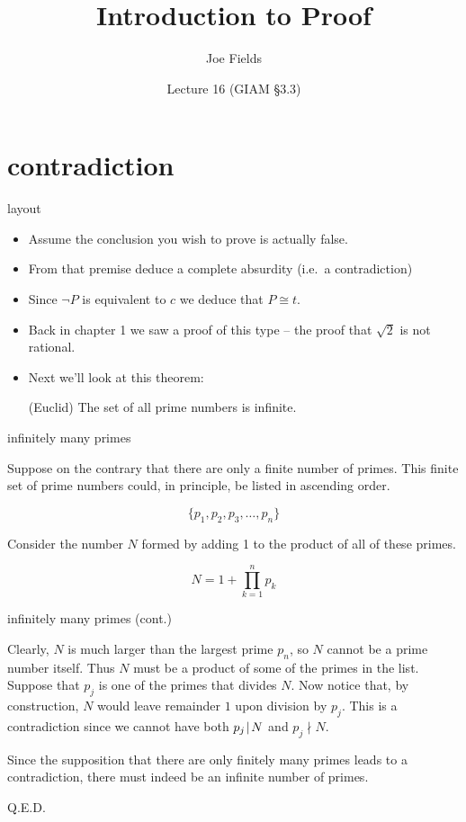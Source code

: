 \documentclass[landscape]{beamer}
\author{Joe Fields}
\title{Introduction to Proof}
\date{Lecture 16 (GIAM \S 3.3)}
\institute[SCSU]{ {\tt fieldsj1@southernct.edu} }
\begin{document}
\begin{frame}[plain]
  \titlepage
\end{frame}

\section{contradiction}

\begin{frame}{layout}
\begin{itemize}
\item  Assume the conclusion you wish to prove is actually false.\pause
\item From that premise deduce a complete absurdity (i.e.\ a contradiction) \pause
\item Since $\lnot P$ is equivalent to $c$ we deduce that $P \cong t$. \pause
\item Back in chapter 1 we saw a proof of this type -- the proof that $\sqrt{2}$ is not rational. \pause
\item Next we'll look at this theorem: \pause
\begin{thm} (Euclid) The set of all prime numbers is infinite.
\end{thm}
\end{itemize}
\end{frame}

\begin{frame}{infinitely many primes}


\noindent Suppose on the contrary that there are only a finite number
of primes.  This finite set of prime numbers could, in principle, be listed
in ascending order.

\[  \{ p_1, p_2, p_3, \ldots , p_n \} \]

Consider the number $N$ formed by adding 1 to the product of all of these 
primes.

\[ N = 1 + \prod_{k=1}^n p_k \]

\end{frame}

\begin{frame}{infinitely many primes (cont.)}

Clearly, $N$ is much larger than the largest prime $p_n$, so $N$ cannot
be a prime number itself.  Thus $N$ must be a product of some of the 
primes in the list.  Suppose that $p_j$ is one of the primes that 
divides $N$.  Now notice that, by construction, $N$ would leave remainder
$1$ upon division by $p_j$.  This is a contradiction since we cannot have
both $p_j \!\mid\! N$ and $p_j \nmid N$. 

Since the supposition that there are only finitely many primes leads to
a contradiction, there must indeed be an infinite number of primes.

\hspace{\fill} Q.E.D.

\end{frame}
\end{document}
